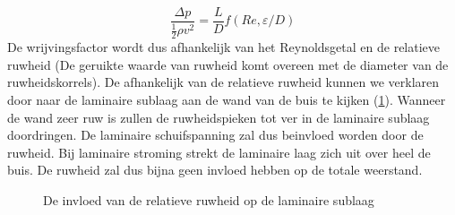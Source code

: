 \begin{equation}
	\frac{\Delta p}{\frac{1}{2}\rho v^2} = \frac{L}{D} f(Re,\varepsilon/D)
	\label{eqn:dimensie analyse drukval turbulent}
\end{equation}
De wrijvingsfactor wordt dus afhankelijk van het Reynoldsgetal en de relatieve ruwheid (De geruikte waarde van ruwheid komt overeen met de diameter van de ruwheidskorrels). De afhankelijk van de relatieve ruwheid kunnen we verklaren door naar de laminaire sublaag aan de wand van de buis te kijken (\ref{fig:Invloed_ruwheid}). Wanneer de wand zeer ruw is zullen de ruwheidspieken tot ver in de laminaire sublaag doordringen. De laminaire schuifspanning zal dus beinvloed worden door de ruwheid. Bij laminaire stroming strekt de laminaire laag zich uit over heel de buis. De ruwheid zal dus bijna geen invloed hebben op de totale weerstand.
\begin{figure}
	\centering
	
	\caption{De invloed van de relatieve ruwheid op de laminaire sublaag}
	\label{fig:Invloed_ruwheid}
\end{figure}

